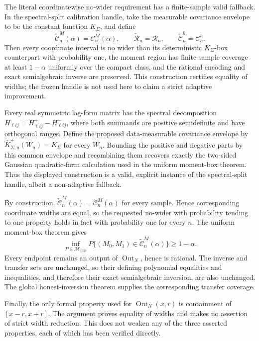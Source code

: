 The literal coordinatewise no-wider requirement has a finite-sample valid
fallback. In the spectral-split calibration handle, take the measurable
covariance envelope to be the constant function \(K_\Sigma\), and define
\[
 \widetilde{\mathcal C}_n^M(\alpha)=\mathcal C_n^M(\alpha),
 \qquad
 \widetilde{\mathcal R}_n=\mathcal R_n,
 \qquad
 \widetilde{\mathcal C}_n^h=\mathcal C_n^h.
\]
Then every coordinate interval is no wider than its deterministic
\(K_\Sigma\)-box counterpart with probability one, the moment region has
finite-sample coverage at least \(1-\alpha\) uniformly over the compact
class, and the rational encoding and exact semialgebraic inverse are
preserved. This construction certifies equality of widths; the frozen
handle is not used here to claim a strict adaptive improvement.

Every real symmetric lag-form matrix has the spectral decomposition
\(H_{\ell ij}=H_{\ell ij}^{+}-H_{\ell ij}^{-}\), where both summands are
positive semidefinite and have orthogonal ranges. Define the proposed
data-measurable covariance envelope by
\(\widehat K_{\Sigma,n}^{+}(W_n)=K_\Sigma\) for every \(W_n\). Bounding the
positive and negative parts by this common envelope and recombining them
recovers exactly the two-sided Gaussian quadratic-form calculation used in
the uniform moment-box theorem. Thus the displayed construction is a
valid, explicit instance of the spectral-split handle, albeit a
non-adaptive fallback.

By construction,
\(\widetilde{\mathcal C}_n^M(\alpha)=\mathcal C_n^M(\alpha)\) for every
sample. Hence corresponding coordinate widths are equal, so the requested
no-wider with probability tending to one property holds in fact with
probability one for every \(n\). The uniform moment-box theorem gives
\[
 \inf_{P\in\mathcal M_{\mathrm{cmp}}}
 P\{(M_0,M_1)\in\widetilde{\mathcal C}_n^M(\alpha)\}
 \ge1-\alpha.
\]
Every endpoint remains an output of \(\operatorname{Out}_N\), hence is
rational. The inverse and transfer sets are unchanged, so their defining
polynomial equalities and inequalities, and therefore their exact
semialgebraic inversion, are also unchanged. The global honest-inversion
theorem supplies the corresponding transfer coverage.

Finally, the only formal property used for \(\operatorname{Out}_N(x,r)\)
is containment of \([x-r,x+r]\). The argument proves equality of widths and
makes no assertion of strict width reduction. This does not weaken any of
the three asserted properties, each of which has been verified directly.

